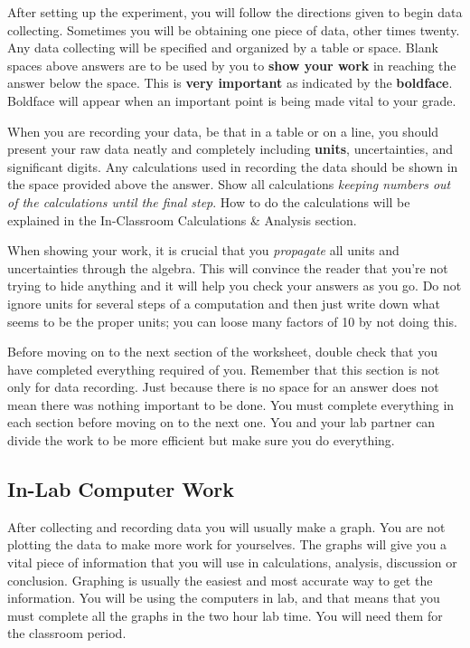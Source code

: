 After setting up the experiment, you will follow the directions given
to begin data collecting.  Sometimes you will be obtaining one piece
of data, other times twenty.  Any data collecting will be specified
and organized by a table or space.  Blank spaces above answers are to
be used by you to {\bf show your work} in reaching the answer below
the space.  This is {\bf very important} as indicated by the {\bf
boldface}.  Boldface will appear when an important point is being made
vital to your grade.  

When you are recording your data, be that in a table or
on a line, you should present your raw data neatly and completely
including {\bf units}, uncertainties, and significant digits.  Any
calculations used in recording the data should be shown in the space
provided above the answer.  Show all calculations {\it keeping numbers
out of the calculations until the final step}.  How to do the
calculations will be explained in the In-Classroom Calculations \&
Analysis section. 

When showing your work, it is crucial that you {\it propagate} all units 
and uncertainties through the algebra. This will convince the reader
that you're not trying to hide anything and it will help you check
your answers as you go.  Do not ignore units for several steps of a
computation and then just write down what seems to be the proper
units; you can loose many factors of 10 by not doing this. 

Before moving on to the next section of the worksheet, 
double check that you have completed everything required of you.  
Remember that this section is not only for data recording.  Just because 
there is no space for an answer does not mean there was nothing important
to be done.  You must complete everything in each section before moving on
to the next one.  You and your lab partner can divide the work to be more
efficient but make sure you do everything. 

\subsection{In-Lab Computer Work} 
After collecting and recording data you will usually make a graph.
You are not plotting the data to make more work for yourselves.  The
graphs will give you a vital piece of information that you will use in 
calculations,
analysis, discussion or conclusion.  Graphing is usually the easiest
and most accurate way to get the information.  You will be using the computers
in lab, and that means that you must complete all the graphs in the two hour
lab time.  You will need them for the classroom period.   

